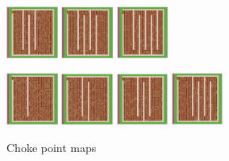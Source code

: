 \documentclass[12pt,letterpaper]{article}
\begin{document}
\begin{figure}[H]
\begin{minipage}[b]{\linewidth}
    \includegraphics[width=0.15\textwidth]{./figures/chokepoint_2_c.png}
    \includegraphics[width=0.15\textwidth]{./figures/chokepoint_2_d.png}
    \includegraphics[width=0.15\textwidth]{./figures/chokepoint_2_e.png}
  \end{minipage}
  \begin{minipage}[b]{\linewidth}
    \includegraphics[width=0.15\textwidth]{./figures/chokepoint_3_a.png}
    \includegraphics[width=0.15\textwidth]{./figures/chokepoint_3_b.png}
    \includegraphics[width=0.15\textwidth]{./figures/chokepoint_3_c.png}
    \includegraphics[width=0.15\textwidth]{./figures/chokepoint_3_d.png}
  \end{minipage}
  \caption{Choke point maps}
  \label{chokepointmaps}
\end{figure}
\end{document}
